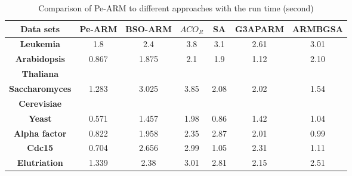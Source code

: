 \documentclass[preprint,12pt]{elsarticle}
\begin{document}
\begin{table}[htbp]
\small
\centering
\caption{Comparison of Pe-ARM to different approaches with the run time (second)}
\begin{tabular}{c c c c c c c}
\toprule
\textbf{Data sets} & Pe-ARM& BSO-ARM & $ACO_{R}$ & SA & G3APARM & ARMBGSA \\
\midrule
\textbf{Leukemia}                &1.8  &2.4  & 3.8  & 3.1 & 2.61 & 3.01\\\hline
\textbf{Arabidopsis}  & \multirow{2}{*}{0.867}& \multirow{2}{*}{1.875}&  \multirow{2}{*}{2.1}  &  \multirow{2}{*}{1.9} &  \multirow{2}{*}{1.12} &  \multirow{2}{*}{2.10}\\
\textbf{Thaliana} &   & &	 &  &  & \\\hline
\textbf{Saccharomyces}&\multirow{2}{*}{1.283}&\multirow{2}{*}{3.025}&\multirow{2}{*}{ 3.85} & \multirow{2}{*}{2.08}&\multirow{2}{*}{ 2.02} &\multirow{2}{*}{ 1.54}\\
\textbf{Cerevisiae} &   & &	 &  &  & \\\hline
\textbf{Yeast}                   &0.571&1.457& 1.98 & 0.86& 1.42 & 1.04\\\hline
\textbf{Alpha factor}            &0.822&1.958& 2.35 & 2.87& 2.01 & 0.99\\\hline
\textbf{Cdc15}                   &0.704&2.656& 2.99 & 1.05& 2.31 & 1.11\\\hline
\textbf{Elutriation}             &1.339&2.38 & 3.01 & 2.81& 2.15 & 2.51\\\hline
\bottomrule
\end{tabular}
\end{table}
\end{document}
